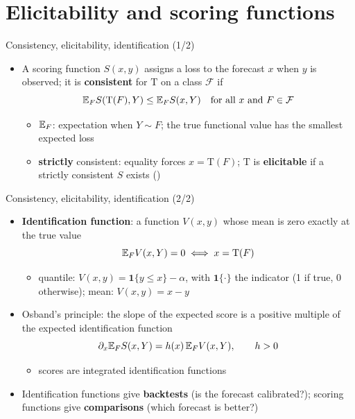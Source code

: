\section{Elicitability and scoring functions}

\begin{frame}{Consistency, elicitability, identification (1/2)}
\itemsize{\small}
\begin{itemize}
    \item A scoring function $S(x, y)$ assigns a loss to the forecast $x$ when $y$ is observed; it is \textbf{consistent} for $\mathrm T$ on a class $\mathcal F$ if 
    \[ \mathbb{E}_F S(\mathrm T(F), Y) \le \mathbb{E}_F S(x, Y) \quad \text{for all } x \text{ and } F \in \mathcal F \]
    \begin{itemize}
        \item $\mathbb{E}_F$: expectation when $Y \sim F$; the true functional value has the smallest expected loss
        \item \textbf{strictly} consistent: equality forces $x = \mathrm T(F)$; $\mathrm T$ is \textbf{elicitable} if a strictly consistent $S$ exists ()
    \end{itemize}
\end{itemize}
\end{frame}

\begin{frame}{Consistency, elicitability, identification (2/2)}
\itemsize{\small}
\begin{itemize}
    \item \textbf{Identification function}: a function $V(x, y)$ whose mean is zero exactly at the true value
    \[ \mathbb{E}_F V(x, Y) = 0 \iff x = \mathrm T(F) \]
    \begin{itemize}
        \item quantile: $V(x, y) = \mathbf 1\{y \le x\} - \alpha$, with $\mathbf 1\{\cdot\}$ the indicator (1 if true, 0 otherwise); mean: $V(x, y) = x - y$
    \end{itemize}
    \item Osband's principle: the slope of the expected score is a positive multiple of the expected identification function 
    \[ \partial_x\mathbb{E}_F S(x, Y) = h(x)\,\mathbb{E}_F V(x, Y), \qquad h > 0 \]
    \begin{itemize}
        \item scores are integrated identification functions
    \end{itemize}
    \item Identification functions give \textbf{backtests} (is the forecast calibrated?); scoring functions give \textbf{comparisons} (which forecast is better?) 
\end{itemize}
\end{frame}

